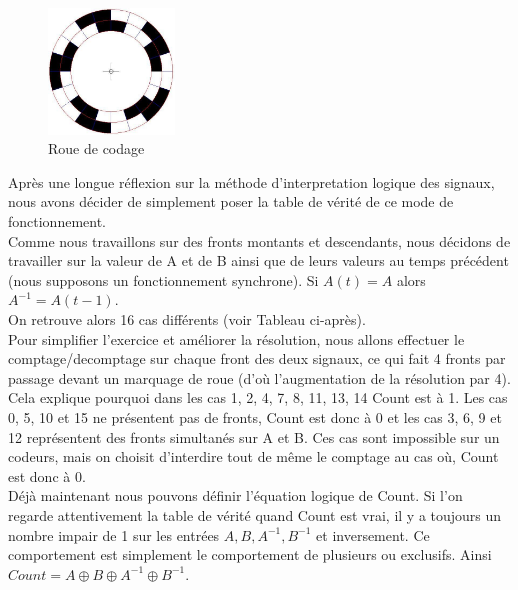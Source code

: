 	\begin{figure}[h!]
  		\centering
  		\includegraphics[width=0.3\textwidth]{img/encoderwheel}
 		\caption{Roue de codage}
  		\label{img:encoderWheel}
	\end{figure}	
	
	Après une longue réflexion sur la méthode d'interpretation logique des signaux, nous avons décider de simplement poser la table de vérité de ce mode de fonctionnement.\\
	Comme nous travaillons sur des fronts montants et descendants, nous décidons de travailler sur la valeur de A et de B ainsi que de leurs valeurs au temps précédent (nous supposons un fonctionnement synchrone). Si $A(t)=A$ alors $A^{-1} = A(t-1)$.\\
	
	On retrouve alors 16 cas différents (voir Tableau ci-après).\\
	Pour simplifier l'exercice et améliorer la résolution, nous allons effectuer le comptage/decomptage sur chaque front des deux signaux, ce qui fait 4 fronts par passage devant un marquage de roue (d'où l'augmentation de la résolution par 4).\\
	Cela explique pourquoi dans les cas 1, 2, 4, 7, 8, 11, 13, 14 Count est à 1. Les cas 0, 5, 10 et 15 ne présentent pas de fronts, Count est donc à 0 et les cas 3, 6, 9 et 12 représentent des fronts simultanés sur A et B. Ces cas sont impossible sur un codeurs, mais on choisit d'interdire tout de m\^eme le comptage au cas où, Count est donc à 0.\\
	
	Déjà maintenant nous pouvons définir l'équation logique de Count. Si l'on regarde attentivement la table de vérité quand Count est vrai, il y a toujours un nombre impair de 1 sur les entrées $A,B,A^{-1},B^{-1}$ et inversement. Ce comportement est simplement le comportement de plusieurs ou exclusifs. Ainsi $Count = A \oplus B \oplus A^{-1} \oplus B^{-1}$.\\
	
